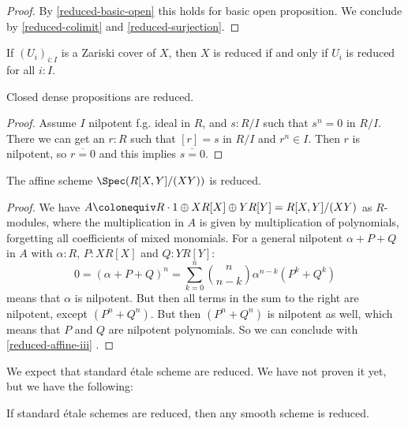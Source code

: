 \begin{proof}
By \cref{reduced-basic-open} this holds for basic open proposition. We conclude by \cref{reduced-colimit} and \cref{reduced-surjection}.
\end{proof}

\begin{corollary}
If $(U_i)_{i:I}$ is a Zariski cover of $X$, then $X$ is reduced if and only if $U_i$ is reduced for all $i:I$.
\end{corollary}

\begin{lemma}
Closed dense propositions are reduced.
\end{lemma}

\begin{proof}
Assume $I$ nilpotent f.g. ideal in $R$, and $s:R/I$ such that $s^n = 0$ in $R/I$. There we can get an $r:R$ such that $[r]=s$ in $R/I$ and $r^n \in I$. Then $r$ is nilpotent, so $\overline{r=0}$ and this implies $\overline{s=0}$.
\end{proof}

\begin{lemma}
  The affine scheme $\Spec(R[X,Y]/(XY))$ is reduced.
\end{lemma}

\begin{proof}
  We have $A\colonequiv R\cdot 1\oplus XR[X] \oplus YR[Y]=R[X,Y]/(XY)$ as $R$-modules,
  where the multiplication in $A$ is given by multiplication of polynomials,
  forgetting all coefficients of mixed monomials.
  For a general nilpotent $\alpha+P+Q$ in $A$ with $\alpha: R$, $P:XR[X]$ and $Q:YR[Y]$:
  \[
  0=(\alpha+P+Q)^n=\sum_{k=0}^n {n \choose n-k} \alpha^{n-k} (P^k+Q^k)
  \]
  means that $\alpha$ is nilpotent.
  But then all terms in the sum to the right are nilpotent, except $(P^n+Q^n)$.
  But then $(P^n+Q^n)$ is nilpotent as well, which means that $P$ and $Q$ are nilpotent polynomials.
  So we can conclude with  \ref{reduced-affine-iii} .
\end{proof}

We expect that standard étale scheme are reduced. We have not proven it yet, but we have the following:

\begin{remark}
If standard étale schemes are reduced, then any smooth scheme is reduced.
\end{remark}

